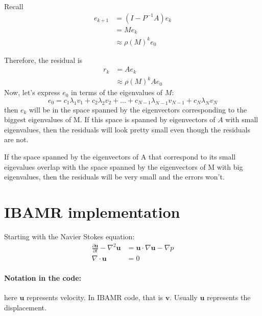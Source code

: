 \documentclass[12pt,a4paper,twoside]{article}
\begin{document}
Recall 
\begin{align}
    e_{k+1} &= (I-P^{-1}A) e_k \\
    &= Me_k \\ 
    &\approx \rho(M)^k e_0
\end{align}

Therefore, the residual is
\begin{align}
r_k &= Ae_k \\
&  \approx \rho(M)^k A e_0
\end{align}
Now, let's express $e_0$ in terms of the eigenvalues of $M$:
\begin{equation}
    e_0 = c_1 \lambda_1 v_1+ c_2 \lambda_2 v_2 + \dots + c_{N-1} \lambda_{N-1} v_{N-1} + c_{N} \lambda_{N} v_N
\end{equation}
then $e_k$ will be in the space spanned by the eigenvectors corresponding to the biggest eigenvalues of M. 
If this space is spanned by eigenvectors of $A$ with small eigenvalues, then the residuals will look pretty small even though the residuals are not. 

If the space spanned by the eigenvectors of A that correspond to its small eigevalues overlap with the space spanned by the eigenvectors of M with big eigenvalues, then the residuals will be very small and the errors won't. 

\section{IBAMR implementation}
Starting with the Navier Stokes equation: 
\begin{equation}\label{eq:navier_stokes}
\begin{split}
      \frac{\partial \bm{u}}{\partial t} - \nabla^2 \bm{u} &= \bm{u}\cdot \nabla \bm{u} - \nabla p \\
      \nabla \cdot \bm{u}&=0
\end{split}
\end{equation}

\paragraph{Notation in the code:} here $\bm{u}$ represents velocity. In IBAMR code, that is $\bm{v}$. Usually $\bm{u}$ represents the displacement. 
\end{document}
